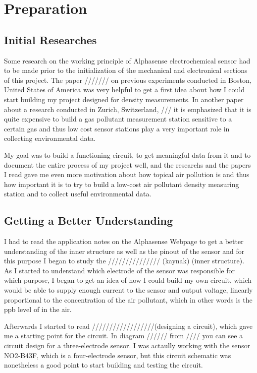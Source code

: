 \chapter{Preparation}
\label{sec:firststeps}

\section{Initial Researches}
Some research on the working principle of Alphasense  electrochemical sensor had to be made prior to the initialization of the mechanical and electronical sections of this project. The paper /////// on previous experiments conducted in Boston, United States of America was very helpful to get a first idea about how I could start building my project designed for  density measurements. In another paper about a research conducted in Zurich, Switzerland, /// it is emphasized that it is quite expensive to build a gas pollutant measurement station sensitive to a certain gas and thus low cost sensor stations play a very important role in collecting environmental data. \par 
My goal was to build a functioning circuit, to get meaningful data from it and to document the entire process of my project well, and the researchs and the papers I read gave me even more motivation about how topical air pollution is and thus how important it is to try to build a low-cost air pollutant density measuring station and to collect useful environmental data.

\section{Getting a Better Understanding}
I had to read the application notes on the Alphasense Webpage to get a better understanding of the inner structure as well as the pinout of the sensor and for this purpose I began to study the /////////////// (kaynak) (inner structure). As I started to understand which electrode of the sensor was responsible for which purpose, I began to get an idea of how I could build my own circuit, which would be able to supply enough current to the sensor and output voltage, linearly proportional to the concentration of the air pollutant, which in other words is the ppb level of  in the air. \par
Afterwards I started to read //////////////////(designing a circuit), which gave me a starting point for the circuit. In diagram ////// from //// you can see a circuit design for a three-electrode sensor. I was actaully working with the sensor NO2-B43F, which is a four-electrode sensor, but this circuit schematic was nonetheless a good point to start building and testing the circuit.

